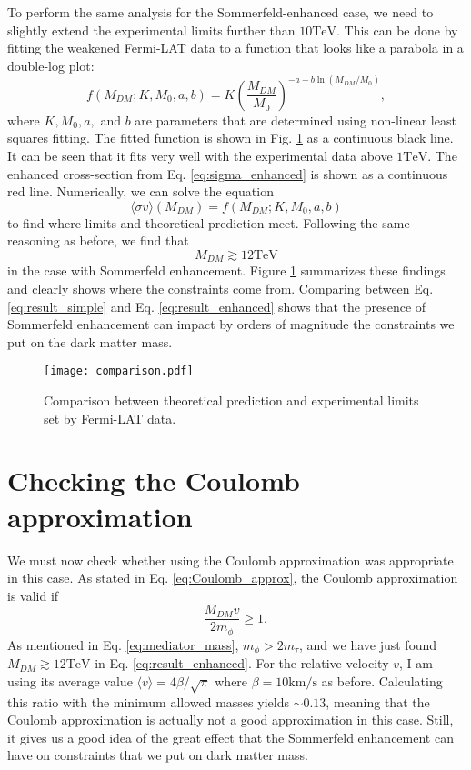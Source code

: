 To perform the same analysis for the Sommerfeld-enhanced case, we need to slightly extend the experimental limits further than \(10 \mathrm{TeV} \). This can be done by fitting the weakened Fermi-LAT data to a function that looks like a parabola in a double-log plot:
\begin{equation}
	f(M_{DM} ;K,M_0,a,b) = K \left( \frac{M_{DM} }{M_0} \right) ^ {-a-b \ln (M_{DM} / M_0)},
\end{equation}
where \(K, M_0, a,\) and \(b\) are parameters that are determined using non-linear least squares fitting. The fitted function is shown in Fig. \ref{fig:comparison} as a continuous black line. It can be seen that it fits very well with the experimental data above \(1\mathrm{TeV} \). The enhanced cross-section from Eq. \ref{eq:sigma_enhanced} is shown as a continuous red line. Numerically, we can solve the equation
\begin{equation}
	\langle \sigma v \rangle (M_{DM} ) = f(M_{DM} ; K,M_0,a,b) 
\end{equation}
to find where limits and theoretical prediction meet. Following the same reasoning as before, we find that
\begin{equation}\label{eq:result_enhanced}
	M_{DM} \gtrsim 12 \mathrm{TeV}
\end{equation}
in the case with Sommerfeld enhancement. Figure \ref{fig:comparison} summarizes these findings and clearly shows where the constraints come from. Comparing between Eq. \ref{eq:result_simple} and Eq. \ref{eq:result_enhanced} shows that the presence of Sommerfeld enhancement can impact by orders of magnitude the constraints we put on the dark matter mass.

\begin{figure}[htbp]
	\centering
	\texttt{[image: comparison.pdf]}
	\caption{Comparison between theoretical prediction and experimental limits set by Fermi-LAT data.}
	\label{fig:comparison}
\end{figure}

\section{Checking the Coulomb approximation}

We must now check whether using the Coulomb approximation was appropriate in this case. As stated in Eq. \eqref{eq:Coulomb_approx}, the Coulomb approximation is valid if
\begin{equation}
	\frac{M_{DM} v}{2 m_{\phi } } \geq 1,
\end{equation}
As mentioned in Eq. \eqref{eq:mediator_mass}, \(m_{\phi } > 2 m_{\tau } \), and we have just found \(M_{DM} \gtrsim 12 \mathrm{TeV} \) in Eq. \eqref{eq:result_enhanced}. For the relative velocity \(v\), I am using its average value \(\langle v \rangle = 4 \beta /\sqrt{\pi } \) where \(\beta = 10 \mathrm{km / s} \) as before. Calculating this ratio with the minimum allowed masses yields \(\sim 0.13\), meaning that the Coulomb approximation is actually not a good approximation in this case. Still, it gives us a good idea of the great effect that the Sommerfeld enhancement can have on constraints that we put on dark matter mass.

